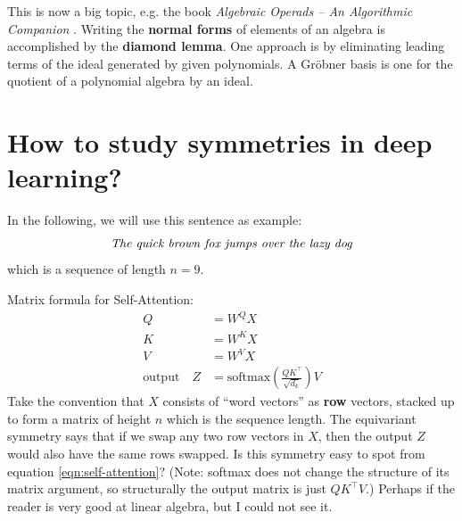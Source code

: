 This is now a big topic, e.g. the book \textit{Algebraic Operads -- An Algorithmic Companion} \cite{Bremner2016}.  Writing the \textbf{normal forms} of elements of an algebra is accomplished by the \textbf{diamond lemma}.  One approach is by eliminating leading terms of the ideal generated by given polynomials.  A Gr\"{o}bner basis is one for the quotient of a polynomial algebra by an ideal.  

\section{How to study symmetries in deep learning?}

In the following, we will use this sentence as example:
\begin{equation}
	\mbox{\textit{The quick brown fox jumps over the lazy dog}}
\end{equation}
which is a sequence of length $n = 9$.

Matrix formula for Self-Attention:
\begin{align}
	Q &= W^Q X \nonumber \\
	K &= W^K X \nonumber \\
	V &= W^V X \nonumber \\
	\boxed{\mbox{output}} \quad  Z &= \mathrm{softmax} \left( \frac{ Q K^\top }{\sqrt{d_k}} \right) V
	\label{eqn:self-attention}
\end{align}
Take the convention that $X$ consists of ``word vectors'' as \textbf{row} vectors, stacked up to form a matrix of height $n$ which is the sequence length.  The equivariant symmetry says that if we swap any two row vectors in $X$, then the output $Z$ would also have the same rows swapped.  Is this symmetry easy to spot from equation \ref{eqn:self-attention}?  (Note: softmax does not change the structure of its matrix argument, so structurally the output matrix is just $QK^\top V$.)  Perhaps if the reader is very good at linear algebra, but I could not see it.


